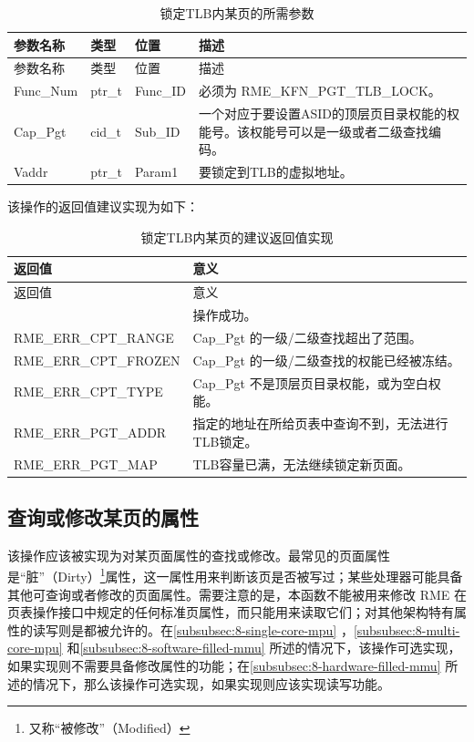 \begin{xltabular}{\textwidth}{@{}>{\hsize\raggedright\arraybackslash}X>{\hsize\raggedright\arraybackslash}X>{\hsize\raggedright\arraybackslash}X>{\hsize\raggedright\arraybackslash}X@{}}
\caption{锁定TLB内某页的所需参数}\label{tab:8-11-lock-page-in-tlb-parameters}\\
\toprule
参数名称 & 类型 & 位置 & 描述\tabularnewline
\endfirsthead
\toprule
参数名称 & 类型 & 位置 & 描述\tabularnewline
\midrule
\endhead
\bottomrule
\endlastfoot
Func\_Num & ptr\_t & Func\_ID & 必须为 RME\_KFN\_PGT\_TLB\_LOCK。\tabularnewline
Cap\_Pgt & cid\_t & Sub\_ID &
一个对应于要设置ASID的顶层页目录权能的权能号。该权能号可以是一级或者二级查找编码。\tabularnewline
Vaddr & ptr\_t & Param1 & 要锁定到TLB的虚拟地址。\tabularnewline
\end{xltabular}

该操作的返回值建议实现为如下：

\begin{xltabular}{\textwidth}{@{}>{\hsize\raggedright\arraybackslash}X>{\hsize\raggedright\arraybackslash}X@{}}
\caption{锁定TLB内某页的建议返回值实现}\label{tab:8-12-lock-page-in-tlb-suggested-return-values}\\
\toprule
返回值 & 意义\tabularnewline
\endfirsthead
\toprule
返回值 & 意义\tabularnewline
\midrule
\endhead
\bottomrule
{} & 操作成功。\tabularnewline
    RME\_ERR\_CPT\_RANGE & Cap\_Pgt 的一级/二级查找超出了范围。\tabularnewline
    RME\_ERR\_CPT\_FROZEN & Cap\_Pgt 的一级/二级查找的权能已经被冻结。\tabularnewline
    RME\_ERR\_CPT\_TYPE & Cap\_Pgt 不是顶层页目录权能，或为空白权能。\tabularnewline
    RME\_ERR\_PGT\_ADDR & 指定的地址在所给页表中查询不到，无法进行TLB锁定。\tabularnewline
    RME\_ERR\_PGT\_MAP & TLB容量已满，无法继续锁定新页面。\tabularnewline
\end{xltabular}

\subsection{查询或修改某页的属性}\label{subsec:8-query-or-modify-page-attributes}

该操作应该被实现为对某页面属性的查找或修改。最常见的页面属性是``脏''（Dirty）\footnote{又称``被修改''（Modified）}属性，这一属性用来判断该页是否被写过；某些处理器可能具备其他可查询或者修改的页面属性。需要注意的是，本函数不能被用来修改 RME 在页表操作接口中规定的任何标准页属性，而只能用来读取它们；对其他架构特有属性的读写则是都被允许的。在\ref{subsubsec:8-single-core-mpu}
，\ref{subsubsec:8-multi-core-mpu}
和\ref{subsubsec:8-software-filled-mmu}
所述的情况下，该操作可选实现，如果实现则不需要具备修改属性的功能；在\ref{subsubsec:8-hardware-filled-mmu}
所述的情况下，那么该操作可选实现，如果实现则应该实现读写功能。

